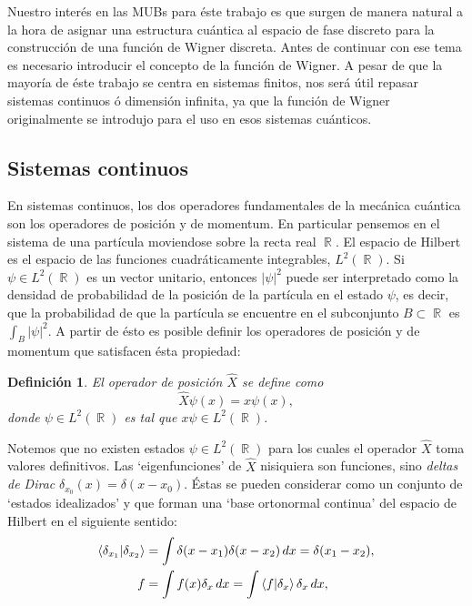 \documentclass[a4paper]{report}
\DeclareMathOperator{\R}{\mathbb{R}}
\newtheorem{definition}{Definición}
\begin{document}
  Nuestro interés en las MUBs para éste trabajo es que
  surgen de manera natural a la hora de asignar una
  estructura cuántica al espacio de fase discreto para la
  construcción de una función de Wigner discreta. Antes de
  continuar con ese tema es necesario introducir el concepto
  de la función de Wigner. A pesar de que la mayoría de éste
  trabajo se centra en sistemas finitos, nos será útil
  repasar sistemas continuos ó dimensión infinita, ya que la
  función de Wigner originalmente se introdujo para el uso
  en esos sistemas cuánticos.

  \subsection{Sistemas continuos}

  En sistemas continuos, los dos operadores fundamentales de
  la mecánica cuántica son los operadores de posición y de
  momentum. En particular pensemos en el sistema de una
  partícula moviendose sobre la recta real $\R$. El espacio
  de Hilbert es el espacio de las funciones cuadráticamente
  integrables, $L^2(\R)$. Si $\psi \in L^2(\R)$ es un vector
  unitario, entonces $|\psi|^2$ puede ser interpretado como
  la densidad de probabilidad de la posición de la partícula
  en el estado $\psi$, es decir, que la probabilidad de que
  la partícula se encuentre en el subconjunto $B \subset \R$
  es $\int_B |\psi|^2$. A partir de ésto es posible definir
  los operadores de posición y de momentum que satisfacen
  ésta propiedad:
  \begin{definition}
    El operador de posición $\hat X$ se define como
    \[
      \hat X\psi(x) = x\psi(x),
    \] 
    donde $\psi \in L^2(\R)$ es tal que $x\psi \in L^2(\R)$.
  \end{definition}
  Notemos que no existen estados $\psi \in L^2(\R)$ para los
  cuales el operador $\hat X$ toma valores definitivos. Las
  `eigenfunciones' de $\hat X$ nisiquiera son funciones,
  sino \textit{deltas de Dirac} $\delta_{x_0}(x) = \delta(x
  - x_0)$. Éstas se pueden considerar como un conjunto de
  `estados idealizados' y que forman una `base ortonormal
  continua' del espacio de Hilbert en el siguiente sentido:
  \begin{align*}
    \braket{\delta_{x_1}|\delta_{x_2}}
    &= \int \delta(x-x_1)\delta(x-x_2) \, dx
    = \delta(x_1-x_2), \\
    f
    &= \int f(x)\delta_x \, dx
    = \int \braket{f| \delta_x}\delta_x \, dx,
  \end{align*} 
\end{document}
